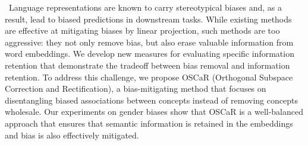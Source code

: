  Language representations are known to carry stereotypical biases and, as a result, lead to biased predictions in downstream tasks. While existing methods are effective at mitigating biases by linear projection, such methods are too aggressive: they not only remove bias, but also erase valuable information from word embeddings. We develop new measures for evaluating specific information retention that demonstrate the tradeoff between bias removal and information retention. To address this challenge, we propose OSCaR (Orthogonal Subspace Correction and Rectification), a bias-mitigating method that focuses on disentangling biased associations between concepts instead of removing concepts wholesale. Our experiments on gender biases show that OSCaR is a well-balanced approach that ensures that semantic information is retained in the embeddings and bias is also effectively mitigated.